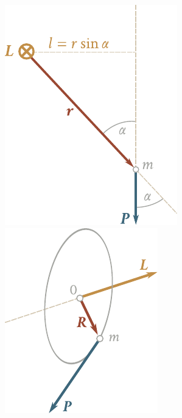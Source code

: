 \begin{figure}[t]
	\begin{minipage}[t]{0.5\linewidth}
		\begin{center}
			\includegraphics[scale=0.95]{figures/ch_03/fig_3_18.pdf}
			\caption[]{}
			\label{fig:3_18}
		\end{center}
	\end{minipage}
	\hspace{-0.05cm}
	\begin{minipage}[t]{0.5\linewidth}
		\begin{center}
			\includegraphics[scale=0.95]{figures/ch_03/fig_3_19.pdf}
			\caption[]{}
			\label{fig:3_19}
		\end{center}
	\end{minipage}
	\vspace{-0.3cm}
\end{figure}

